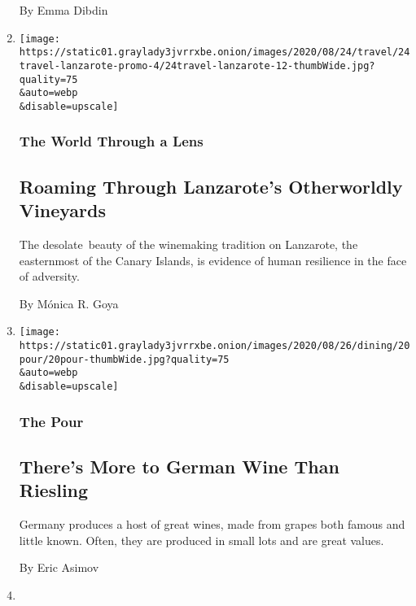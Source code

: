 \begin{enumerate}
  By Emma Dibdin
\item
  \href{/2020/08/24/travel/lanzarote-canary-islands.html}{}

  \texttt{[image: https://static01.graylady3jvrrxbe.onion/images/2020/08/24/travel/24travel-lanzarote-promo-4/24travel-lanzarote-12-thumbWide.jpg?quality=75\\\&auto=webp\\\&disable=upscale]}

  \hypertarget{the-world-through-a-lens}{%
  \subsubsection{The World Through a
  Lens}\label{the-world-through-a-lens}}

  \hypertarget{roaming-through-lanzarotes-otherworldly-vineyards}{%
  \subsection{Roaming Through Lanzarote's Otherworldly
  Vineyards}\label{roaming-through-lanzarotes-otherworldly-vineyards}}

  The desolate~beauty of the winemaking tradition on Lanzarote, the
  easternmost of the Canary Islands, is evidence of human resilience in
  the face of adversity.

  By Mónica R. Goya
\item
  \href{/2020/08/20/dining/drinks/german-wines.html}{}

  \texttt{[image: https://static01.graylady3jvrrxbe.onion/images/2020/08/26/dining/20pour/20pour-thumbWide.jpg?quality=75\\\&auto=webp\\\&disable=upscale]}

  \hypertarget{the-pour-4}{%
  \subsubsection{The Pour}\label{the-pour-4}}

  \hypertarget{theres-more-to-german-wine-than-riesling}{%
  \subsection{There's More to German Wine Than
  Riesling}\label{theres-more-to-german-wine-than-riesling}}

  Germany produces a host of great wines, made from grapes both famous
  and little known. Often, they are produced in small lots and are great
  values.

  By Eric Asimov
\item
  \href{/2020/08/14/dining/drinks/beer-cocktails.html}{}


\end{enumerate}
